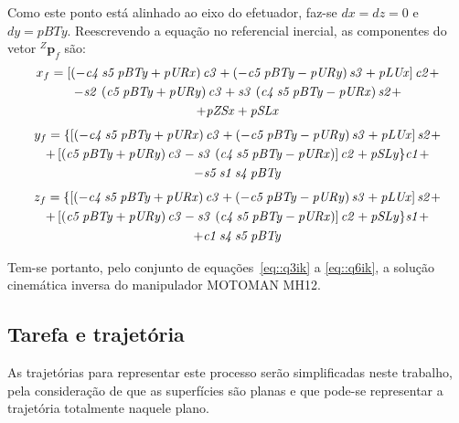Como este ponto está alinhado ao eixo do efetuador, faz-se $dx = dz = 0$ e $dy
= pBTy$.
Reescrevendo a equação no referencial inercial, as componentes do vetor
$^{Z}\mathbf{p}_{f}$ são:
%
\begin{multline}
	x_f =  \left[  \left( -{\it c4}\,{\it s5}\,{\it pBTy}+{\it pURx} \right) {
		\it c3}+ \left( -{\it c5}\,{\it pBTy}-{\it pURy} \right) {\it s3}+{
		\it pLUx} \right] {\it c2} +
		\\ -{\it s2}\, \left( {\it c5}\,{\it pBTy}+{
		\it pURy} \right) {\it c3}+{\it s3}\, \left( {\it c4}\,{\it s5}\,{\it 
		pBTy}-{\it pURx} \right) {\it s2}+
		\\ +{\it pZSx}+{\it pSLx}
\end{multline}
\vspace{-15mm}
\begin{multline}
	y_f =  \{ \left[  \left( -{\it c4}\,{\it s5}\,{\it pBTy}+{\it pURx}
 		\right) {\it c3}+ \left( -{\it c5}\,{\it pBTy}-{\it pURy} \right) {
		\it s3}+{\it pLUx} \right] {\it s2}+ 
		\\ + \left[  \left( {\it c5}\,{\it 
		pBTy}+{\it pURy} \right) {\it c3}-{\it s3}\, \left( {\it c4}\,{\it s5}
		\,{\it pBTy}-{\it pURx} \right)  \right] {\it c2}+{\it pSLy} \} {
		\it c1} +
		\\ -{\it s5}\,{\it s1}\,{\it s4}\,{\it pBTy}
\end{multline}
\vspace{-15mm}
\begin{multline}
	z_f =  \{  \left[ \left( -{\it c4}\,{\it s5}\,{\it pBTy}+{\it pURx}
 		\right) {\it c3}+ \left( -{\it c5}\,{\it pBTy}-{\it pURy} \right) {
		\it s3}+{\it pLUx} \right] {\it s2}+ 
		\\ + \left[ \left( {\it c5}\,{\it 
		pBTy}+{\it pURy} \right) {\it c3}-{\it s3}\, \left( {\it c4}\,{\it s5}
		\,{\it pBTy}-{\it pURx} \right)  \right] {\it c2}+{\it pSLy} \} {
		\it s1} +
		\\ +{\it c1}\,{\it s4}\,{\it s5}\,{\it pBTy}
\end{multline}



Tem-se portanto, pelo conjunto de equações~\ref{eq::q3ik} a \ref{eq::q6ik}, a
solução cinemática inversa do manipulador MOTOMAN MH12.


\subsection{Tarefa e trajetória} \label{sec::tarefa_traj}

As trajetórias para representar este processo serão simplificadas neste
trabalho, pela consideração de que as superfícies são planas e que pode-se
representar a trajetória totalmente naquele plano.


